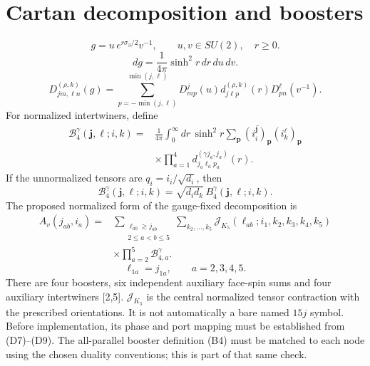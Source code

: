 \documentclass[11pt,a4paper]{article}
\newcommand{\eq}[2]{\begin{equation}#2\tag{#1}\end{equation}}
\begin{document}
\section{Cartan decomposition and boosters}
\eq{B1}{g=u\,e^{r\sigma_3/2}v^{-1},\qquad u,v\in SU(2),\quad r\ge0.}
\eq{B2}{dg=\frac1{4\pi}\sinh^2r\,dr\,du\,dv.}
\eq{B3}{D^{(\rho,k)}_{jm,\ell n}(g)=\sum_{p=-\min(j,\ell)}^{\min(j,\ell)}D^j_{mp}(u)d^{(\rho,k)}_{j\ell p}(r)D^\ell_{pn}(v^{-1}).}
For normalized intertwiners, define
\eq{B4}{\boxed{\begin{aligned}
\mathcal B_4^\gamma(\mathbf j,\boldsymbol\ell;i,k)={}&\frac1{4\pi}\int_0^\infty dr\,\sinh^2r\sum_{\mathbf p}\overline{(i_i^{\mathbf j})_{\mathbf p}}(i_k^{\boldsymbol\ell})_{\mathbf p}\\
&\times\prod_{a=1}^4d^{(\gamma j_a,j_a)}_{j_a\ell_a p_a}(r).
\end{aligned}}}
If the unnormalized tensors are $q_i=i_i/\sqrt{d_i}$, then
\eq{B5}{\mathcal B_4^\gamma(\mathbf j,\boldsymbol\ell;i,k)=\sqrt{d_id_k}\,B_4^\gamma(\mathbf j,\boldsymbol\ell;i,k).}
The proposed normalized form of the gauge-fixed decomposition is
\eq{B6}{\boxed{\begin{aligned}
A_v(j_{ab},i_a)={}&\sum_{\substack{\ell_{ab}\ge j_{ab}\\2\le a<b\le5}}\sum_{k_2,\ldots,k_5}
\mathcal J_{K_5}(\ell_{ab};i_1,k_2,k_3,k_4,k_5)\\
&\times\prod_{a=2}^5\mathcal B_{4,a}^\gamma.
\end{aligned}}}
\eq{B7}{\ell_{1a}=j_{1a},\qquad a=2,3,4,5.}
There are four boosters, six independent auxiliary face-spin sums and four auxiliary intertwiners [2,5]. $\mathcal J_{K_5}$ is the central normalized tensor contraction with the prescribed orientations. It is not automatically a bare named $15j$ symbol. Before implementation, its phase and port mapping must be established from (D7)--(D9). The all-parallel booster definition (B4) must be matched to each node using the chosen duality conventions; this is part of that same check.
\end{document}
